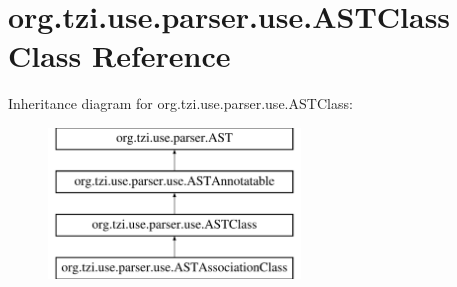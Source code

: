 \hypertarget{classorg_1_1tzi_1_1use_1_1parser_1_1use_1_1_a_s_t_class}{\section{org.\-tzi.\-use.\-parser.\-use.\-A\-S\-T\-Class Class Reference}
\label{classorg_1_1tzi_1_1use_1_1parser_1_1use_1_1_a_s_t_class}
}
Inheritance diagram for org.\-tzi.\-use.\-parser.\-use.\-A\-S\-T\-Class\-:\begin{figure}[H]
\begin{center}
\leavevmode
\includegraphics[height=4.000000cm]{classorg_1_1tzi_1_1use_1_1parser_1_1use_1_1_a_s_t_class}
\end{center}
\end{figure}
